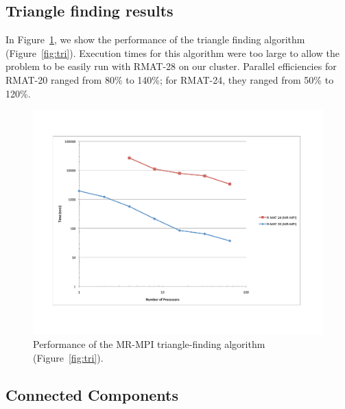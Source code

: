 \subsection{Triangle finding results}

In Figure~\ref{f:tri}, we show the performance of the triangle finding
algorithm (Figure~\ref{fig:tri}).  Execution times for this algorithm
were too large to allow the problem to be easily run with RMAT-28 on
our cluster.  Parallel efficiencies for RMAT-20 ranged from 80\% to
140\%; for RMAT-24, they ranged from 50\% to 120\%.


\begin{figure}[htb]
\includegraphics[width=\textwidth]{fig_tri.pdf}
\caption{Performance of the MR-MPI triangle-finding algorithm
(Figure~\ref{fig:tri}).}
\label{f:tri}
\end{figure}

\subsection{Connected Components}

